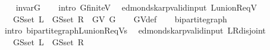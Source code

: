 \begin{isabellebody}
\isanewline
%
\endisadeliminvisible
%
\isadelimproof
\ \ %
\endisadelimproof
%
\isatagproof
{}\isamarkupfalse%
\ invar{\isacharunderscore}{\kern0pt}G\isanewline
\ \ \isamarkupfalse%
\ {\isacharparenleft}{\kern0pt}intro\ G{\isachardot}{\kern0pt}finite{\isacharunderscore}{\kern0pt}V{\isacharparenright}{\kern0pt}%
\endisatagproof
{\isafoldproof}%
%
\isadelimproof
\isanewline
%
\endisadelimproof
%
\isadeliminvisible
\isanewline
%
\endisadeliminvisible
%
\isataginvisible
{}\isamarkupfalse%
\ {\isacharparenleft}{\kern0pt}\ edmonds{\isacharunderscore}{\kern0pt}karp{\isacharunderscore}{\kern0pt}valid{\isacharunderscore}{\kern0pt}input{\isacharparenright}{\kern0pt}\ L{\isacharunderscore}{\kern0pt}union{\isacharunderscore}{\kern0pt}R{\isacharunderscore}{\kern0pt}eq{\isacharunderscore}{\kern0pt}V{\isacharcolon}{\kern0pt}\isanewline
\ \ \ {\isachardoublequoteopen}G{\isachardot}{\kern0pt}S{\isachardot}{\kern0pt}set\ L\ {\isasymunion}\ G{\isachardot}{\kern0pt}S{\isachardot}{\kern0pt}set\ R\ {\isacharequal}{\kern0pt}\ G{\isachardot}{\kern0pt}V\ G{\isachardoublequoteclose}%
\endisataginvisible
{\isafoldinvisible}%
%
\isadeliminvisible
\isanewline
%
\endisadeliminvisible
%
\isadelimproof
\ \ %
\endisadelimproof
%
\isatagproof
{}\isamarkupfalse%
\ G{\isachardot}{\kern0pt}V{\isacharunderscore}{\kern0pt}def\isanewline
\ \ \isamarkupfalse%
\ bipartite{\isacharunderscore}{\kern0pt}graph\isanewline
\ \ \isamarkupfalse%
\ {\isacharparenleft}{\kern0pt}intro\ bipartite{\isacharunderscore}{\kern0pt}graph{\isachardot}{\kern0pt}L{\isacharunderscore}{\kern0pt}union{\isacharunderscore}{\kern0pt}R{\isacharunderscore}{\kern0pt}eq{\isacharunderscore}{\kern0pt}Vs{\isacharparenright}{\kern0pt}%
\endisatagproof
{\isafoldproof}%
%
\isadelimproof
\isanewline
%
\endisadelimproof
%
\isadeliminvisible
\isanewline
%
\endisadeliminvisible
%
\isataginvisible
{}\isamarkupfalse%
\ {\isacharparenleft}{\kern0pt}\ edmonds{\isacharunderscore}{\kern0pt}karp{\isacharunderscore}{\kern0pt}valid{\isacharunderscore}{\kern0pt}input{\isacharparenright}{\kern0pt}\ L{\isacharunderscore}{\kern0pt}R{\isacharunderscore}{\kern0pt}disjoint{\isacharcolon}{\kern0pt}\isanewline
\ \ \ {\isachardoublequoteopen}G{\isachardot}{\kern0pt}S{\isachardot}{\kern0pt}set\ L\ {\isasyminter}\ G{\isachardot}{\kern0pt}S{\isachardot}{\kern0pt}set\ R\ {\isacharequal}{\kern0pt}\ {\isacharbraceleft}{\kern0pt}{\isacharbraceright}{\kern0pt}{\isachardoublequoteclose}%

\end{isabellebody}
